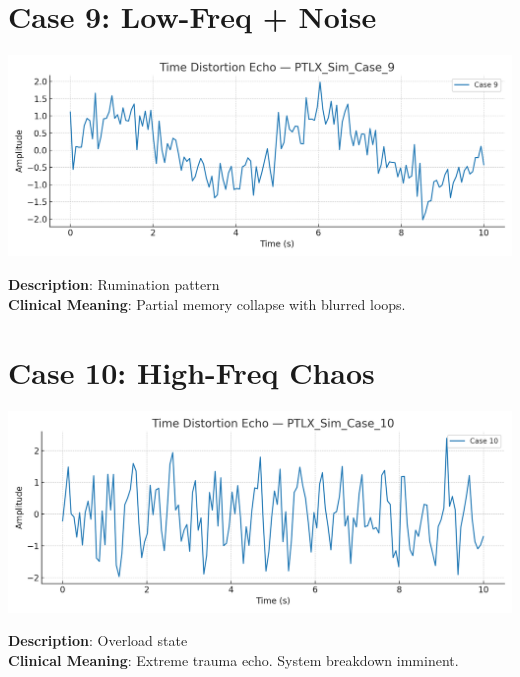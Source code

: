 \documentclass[12pt]{article}
\begin{document}
\section*{Case 9: Low-Freq + Noise}
\begin{center}
\includegraphics[width=0.95\linewidth]{PTLX_Sim_Case_9.png}
\end{center}
\textbf{Description}: Rumination pattern \\

\textbf{Clinical Meaning}: Partial memory collapse with blurred loops.

\newpage

\section*{Case 10: High-Freq Chaos}
\begin{center}
\includegraphics[width=0.95\linewidth]{PTLX_Sim_Case_10.png}
\end{center}
\textbf{Description}: Overload state \\

\textbf{Clinical Meaning}: Extreme trauma echo. System breakdown imminent.

\newpage
\end{document}
